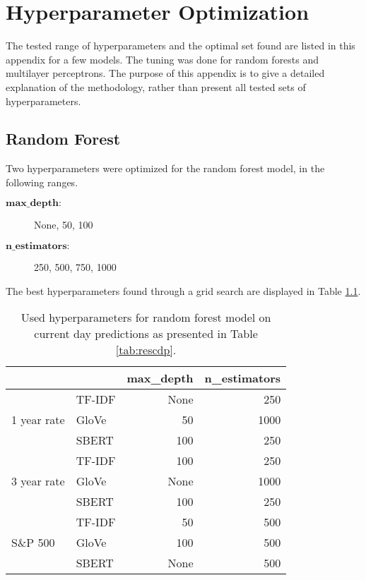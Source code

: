 \chapter{Hyperparameter Optimization}\label{appendix:B}

The tested range of hyperparameters and the optimal set found are listed in this appendix for a few models. The tuning was done for random forests and multilayer perceptrons. The purpose of this appendix is to give a detailed explanation of the methodology, rather than present all tested sets of hyperparameters. 

\section{Random Forest}

Two hyperparameters were optimized for the random forest model, in the following ranges.  
\begin{description}
    \item[$\textbf{max\_depth}:$]  None, 50, 100
    \item[$\textbf{n\_estimators}:$] 250, 500, 750, 1000
\end{description}
    

The best hyperparameters found through a grid search are displayed in Table \ref{tab:rf_hyper_cd}.

\begin{table}[H]
    \centering
    \begin{tabular}{llrr}
          & & \textbf{max\_depth} & \textbf{n\_estimators} \\
         \hline \hline
         \multirow{3}{*}{1 year rate} & TF-IDF & None & 250  \\
         & GloVe & 50 & 1000   \\
         & SBERT & 100 & 250  \\
         \hline 
         \multirow{3}{*}{3 year rate} & TF-IDF & 100 & 250  \\
         & GloVe & None & 1000  \\
         & SBERT & 100 & 250  \\
         \hline 
         \multirow{3}{*}{S\&P 500} & TF-IDF & 50 & 500  \\
         & GloVe & 100 & 500  \\
         & SBERT & None & 500  \\
         \hline 
    \end{tabular}
    \caption{Used hyperparameters for random forest model on current day predictions as presented in Table \ref{tab:rescdp}.}
    \label{tab:rf_hyper_cd}
\end{table}

